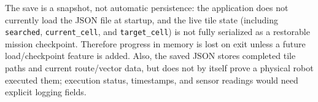 \documentclass[11pt]{article}
\begin{document}
The save is a snapshot, not automatic persistence: the application does not
currently load the JSON file at startup, and the live tile state (including
\texttt{searched}, \texttt{current\_cell}, and \texttt{target\_cell}) is not
fully serialized as a restorable mission checkpoint. Therefore progress in
memory is lost on exit unless a future load/checkpoint feature is added. Also,
the saved JSON stores completed tile paths and current route/vector data, but
does not by itself prove a physical robot executed them; execution status,
timestamps, and sensor readings would need explicit logging fields.
\end{document}
